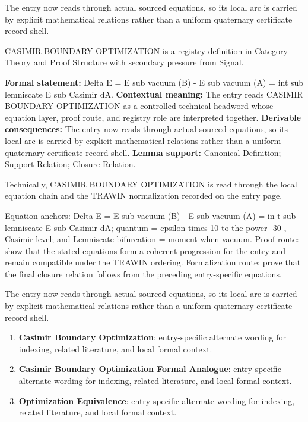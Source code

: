 The entry now reads through actual sourced equations, so its local arc is carried by explicit mathematical relations rather than a uniform quaternary certificate record shell.
\clearpage


\begingroup\small
{}
CASIMIR BOUNDARY OPTIMIZATION is a registry definition in Category Theory and Proof Structure with secondary pressure from Signal.

\begingroup\footnotesize\setlength{\emergencystretch}{3em}\sloppy
\textbf{Formal statement:} Delta E = E sub vacuum (B) - E sub vacuum (A) = int sub lemniscate E sub Casimir dA. \textbf{Contextual meaning:} The entry reads CASIMIR BOUNDARY OPTIMIZATION as a controlled technical headword whose equation layer, proof route, and registry role are interpreted together. \textbf{Derivable consequences:} The entry now reads through actual sourced equations, so its local arc is carried by explicit mathematical relations rather than a uniform quaternary certificate record shell. \textbf{Lemma support:} Canonical Definition; Support Relation; Closure Relation.\par
\endgroup

Technically, CASIMIR BOUNDARY OPTIMIZATION is read through the local equation chain and the TRAWIN normalization recorded on the entry page.

Equation anchors: Delta E = E sub vacuum (B) - E sub vacuum (A) = in t sub lemniscate E sub Casimir dA; quantum = epsilon times 10 to the power -30 , Casimir-level; and Lemniscate bifurcation = moment when vacuum. Proof route: show that the stated equations form a coherent progression for the entry and remain compatible under the TRAWIN ordering. Formalization route: prove that the final closure relation follows from the preceding entry-specific equations.

The entry now reads through actual sourced equations, so its local arc is carried by explicit mathematical relations rather than a uniform quaternary certificate record shell.
\endgroup

\begin{enumerate}[leftmargin=1.6em,itemsep=6pt,topsep=4pt]
\item \textbf{Casimir Boundary Optimization}: entry-specific alternate wording for indexing, related literature, and local formal context.
\item \textbf{Casimir Boundary Optimization Formal Analogue}: entry-specific alternate wording for indexing, related literature, and local formal context.
\item \textbf{Optimization Equivalence}: entry-specific alternate wording for indexing, related literature, and local formal context.
\end{enumerate}

